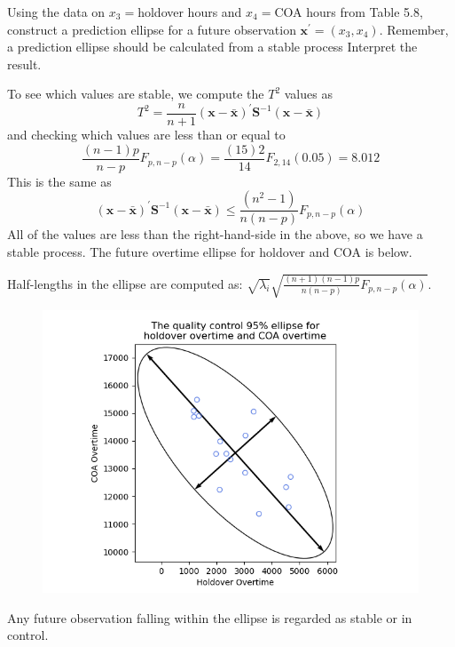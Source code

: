 Using the data on $x_{3} = $holdover hours and $x_{4} = $COA hours from Table 5.8, construct
a prediction ellipse for a future observation $\textbf{x}^{\prime} = (x_{3}, x_{4})$. Remember, a prediction ellipse
should be calculated from a stable process Interpret the result.
\par
To see which values are stable, we compute the $T^{2}$ values as
\[
    T^{2}
    =
    \frac{n}{n+1}
    {(\textbf{x} - \bar{\textbf{x}})}^{\prime}
    \textbf{S}^{-1}
    (\textbf{x} - \bar{\textbf{x}})
\]
and checking which values are less than or equal to
\[
    \frac{(n-1)p}{n-p}
    F_{p,n-p}(\alpha)
    =
    \frac{(15)2}{14}
    F_{2,14}(0.05)
    =
    8.012
\]
This is the same as
\[
    {(\textbf{x} - \bar{\textbf{x}})}^{\prime}
    \textbf{S}^{-1}
    (\textbf{x} - \bar{\textbf{x}})
    \leq
    \frac{(n^{2} - 1)}{n(n - p)}
    F_{p,n-p}(\alpha)
\]
All of the values are less than the right-hand-side in the above, so we have a stable process. The future overtime ellipse for holdover and COA is below.

Half-lengths in the ellipse are computed as: $\sqrt{\lambda_{i}}\sqrt{\frac{(n+1)(n-1)p}{n(n-p)}F_{p, n-p}(\alpha)}$.

\begin{figure}[H]
    \centering
    \includegraphics[scale=0.65]{./python/chapter-5/Question-5-27-Future-Ellipse.png}
\end{figure}

Any future observation falling within the ellipse is regarded as stable or in control.